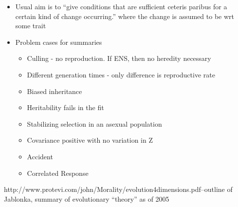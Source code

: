\begin{itemize}
	\item
	
	Usual aim is to ``give conditions that are sufficient ceteris paribus
	for a certain kind of change occurring.'' where the change is assumed
	to be wrt some trait
	
	\item
	
	Problem cases for summaries
	
	
	\begin{itemize}
		\item
		
		Culling - no reproduction. If ENS, then no heredity necessary
		
		\item
		
		Different generation times - only difference is reproductive rate
		
		\item
		
		Biased inheritance
		
		\item
		
		Heritability fails in the fit
		
		\item
		
		Stabilizing selection in an asexual population
		
		\item
		
		Covariance positive with no variation in Z
		
		\item
		
		Accident
		
		\item
		
		Correlated Response
		
	\end{itemize}
\end{itemize}


http://www.protevi.com/john/Morality/evolution4dimensions.pdf--outline of Jablonka, summary of evolutionary ``theory'' as of 2005

